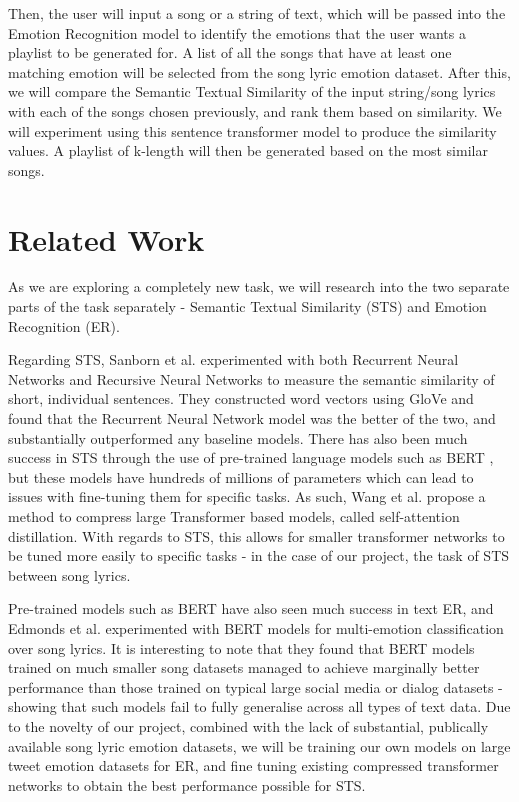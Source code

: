 \documentclass[11pt]{article}
\begin{document}
Then, the user will input a song or a string of text, which will be passed into the Emotion Recognition model to identify the emotions that the user wants a playlist to be generated for. A list of all the songs that have at least one matching emotion will be selected from the song lyric emotion dataset. After this, we will compare the Semantic Textual Similarity of the input string/song lyrics with each of the songs chosen previously, and rank them based on similarity. We will experiment using this\cite{sentence-transformer} sentence transformer model to produce the similarity values. A playlist of k-length will then be generated based on the most similar songs.

\section{Related Work}
As we are exploring a completely new task, we will research into the two separate parts of the task separately - Semantic Textual Similarity (STS) and Emotion Recognition (ER). 

Regarding STS, Sanborn et al. \cite{Sanborn2015DeepLF} experimented with both Recurrent Neural Networks and Recursive Neural Networks to measure the semantic similarity of short, individual sentences. They constructed word vectors using GloVe \cite{pennington-etal-2014-glove} and found that the Recurrent Neural Network model was the better of the two, and substantially outperformed any baseline models. There has also been much success in STS through the use of pre-trained language models such as BERT \cite{devlin-etal-2019-bert}, but these models have hundreds of millions of parameters which can lead to issues with fine-tuning them for specific tasks. As such, Wang et al. \cite{wang2020minilm} propose a method to compress large Transformer based models, called self-attention distillation. With regards to STS, this allows for smaller transformer networks to be tuned more easily to specific tasks - in the case of our project, the task of STS between song lyrics.

Pre-trained models such as BERT have also seen much success in text ER, and Edmonds et al. \cite{edmonds-sedoc-2021-multi} experimented with BERT models for multi-emotion classification over song lyrics. It is interesting to note that they found that BERT models trained on much smaller song datasets managed to achieve marginally better performance than those trained on typical large social media or dialog datasets - showing that such models fail to fully generalise across all types of text data. Due to the novelty of our project, combined with the lack of substantial, publically available song lyric emotion datasets, we will be training our own models on large tweet emotion datasets for ER, and fine tuning existing compressed transformer networks to obtain the best performance possible for STS.
\end{document}

